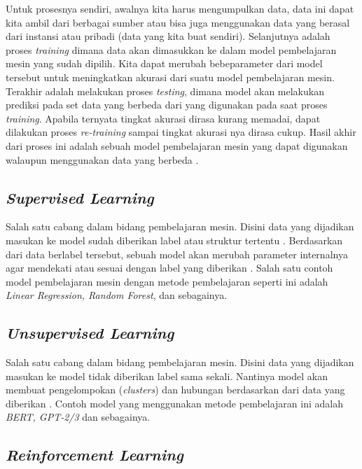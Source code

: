 Untuk prosesnya sendiri, awalnya kita harus mengumpulkan data, data ini dapat kita ambil dari  berbagai sumber atau bisa juga menggunakan data yang berasal dari instansi atau pribadi (data yang kita buat sendiri). Selanjutnya adalah proses \textit{training} dimana data akan dimasukkan ke dalam model pembelajaran mesin yang sudah dipilih. Kita dapat merubah bebe\rapa parameter dari model tersebut untuk meningkatkan akurasi dari suatu model pembelajaran mesin. Terakhir adalah melakukan proses \textit{testing}, dimana model akan melakukan prediksi pada set data yang berbeda dari yang digunakan pada saat proses \textit{training}. Apabila ternyata tingkat akurasi dirasa kurang memadai, dapat dilakukan proses \textit{re-training} sampai tingkat akurasi nya dirasa cukup. Hasil akhir dari proses ini adalah sebuah model pembelajaran mesin yang dapat digunakan walaupun menggunakan data yang berbeda \cite{mit_ml_expl}.

\subsection{\textit{Supervised Learning}}

Salah satu cabang dalam bidang pembelajaran mesin. Disini data yang dijadikan masukan ke model sudah diberikan label atau struktur tertentu \cite{ms_ml_expl}. Berdasarkan dari data berlabel tersebut, sebuah model akan merubah parameter internalnya agar mendekati atau sesuai dengan label yang diberikan \cite{ibm_ml_expl}. Salah satu contoh model pembelajaran mesin dengan metode pembelajaran seperti ini adalah \textit{Linear Regression, Random Forest}, dan sebagainya.

\subsection{\textit{Unsupervised Learning}}

Salah satu cabang dalam bidang pembelajaran mesin. Disini data yang dijadikan masukan ke model tidak diberikan label sama sekali. Nantinya model akan membuat pengelompokan (\textit{clusters}) dan hubungan berdasarkan dari data yang diberikan \cite{mit_ml_expl}. Contoh model yang menggunakan metode pembelajaran ini adalah \textit{BERT, GPT-2/3} dan sebagainya.

\subsection{\textit{Reinforcement Learning}}

